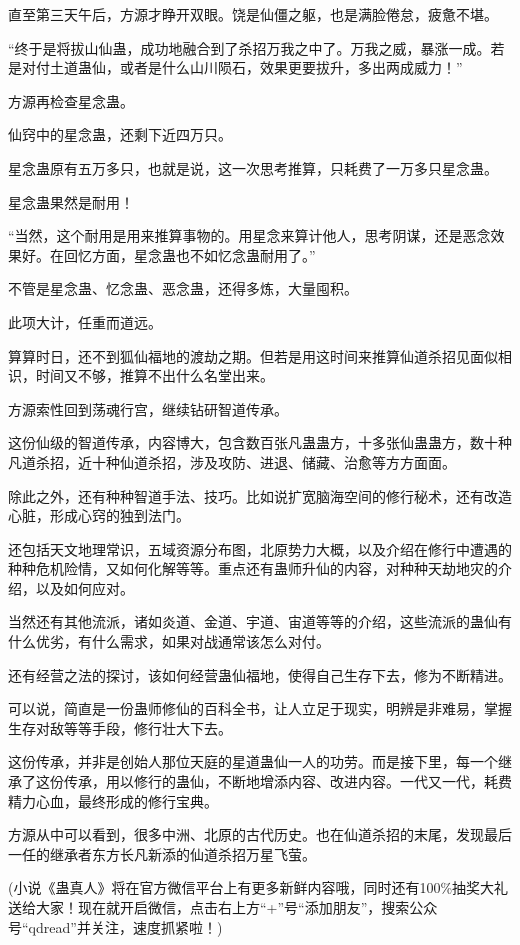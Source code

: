 \begin{this_body}
直至第三天午后，方源才睁开双眼。饶是仙僵之躯，也是满脸倦怠，疲惫不堪。

“终于是将拔山仙蛊，成功地融合到了杀招万我之中了。万我之威，暴涨一成。若是对付土道蛊仙，或者是什么山川陨石，效果更要拔升，多出两成威力！”

方源再检查星念蛊。

仙窍中的星念蛊，还剩下近四万只。

星念蛊原有五万多只，也就是说，这一次思考推算，只耗费了一万多只星念蛊。

星念蛊果然是耐用！

“当然，这个耐用是用来推算事物的。用星念来算计他人，思考阴谋，还是恶念效果好。在回忆方面，星念蛊也不如忆念蛊耐用了。”

不管是星念蛊、忆念蛊、恶念蛊，还得多炼，大量囤积。

此项大计，任重而道远。

算算时日，还不到狐仙福地的渡劫之期。但若是用这时间来推算仙道杀招见面似相识，时间又不够，推算不出什么名堂出来。

方源索性回到荡魂行宫，继续钻研智道传承。

这份仙级的智道传承，内容博大，包含数百张凡蛊蛊方，十多张仙蛊蛊方，数十种凡道杀招，近十种仙道杀招，涉及攻防、进退、储藏、治愈等方方面面。

除此之外，还有种种智道手法、技巧。比如说扩宽脑海空间的修行秘术，还有改造心脏，形成心窍的独到法门。

还包括天文地理常识，五域资源分布图，北原势力大概，以及介绍在修行中遭遇的种种危机险情，又如何化解等等。重点还有蛊师升仙的内容，对种种天劫地灾的介绍，以及如何应对。

当然还有其他流派，诸如炎道、金道、宇道、宙道等等的介绍，这些流派的蛊仙有什么优劣，有什么需求，如果对战通常该怎么对付。

还有经营之法的探讨，该如何经营蛊仙福地，使得自己生存下去，修为不断精进。

可以说，简直是一份蛊师修仙的百科全书，让人立足于现实，明辨是非难易，掌握生存对敌等等手段，修行壮大下去。

这份传承，并非是创始人那位天庭的星道蛊仙一人的功劳。而是接下里，每一个继承了这份传承，用以修行的蛊仙，不断地增添内容、改进内容。一代又一代，耗费精力心血，最终形成的修行宝典。

方源从中可以看到，很多中洲、北原的古代历史。也在仙道杀招的末尾，发现最后一任的继承者东方长凡新添的仙道杀招万星飞萤。

(小说《蛊真人》将在官方微信平台上有更多新鲜内容哦，同时还有100\%抽奖大礼送给大家！现在就开启微信，点击右上方“+”号“添加朋友”，搜索公众号“qdread”并关注，速度抓紧啦！)

\end{this_body}

